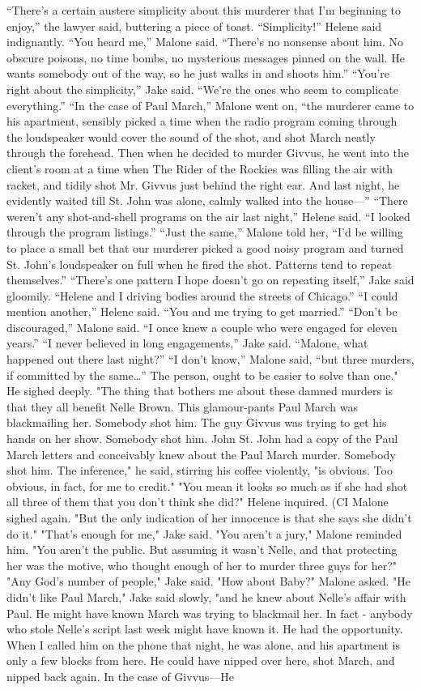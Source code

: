 \documentclass{novel}
\begin{document}
“There’s a certain austere simplicity about this murderer that I’m beginning to enjoy,” the lawyer said, buttering a piece of toast. “Simplicity!” Helene said indignantly. “You heard me,” Malone said. “There’s no nonsense about him. No obscure poisons, no time bombs, no mysterious messages pinned on the wall. He wants somebody out of the way, so he just walks in and shoots him.” “You’re right about the simplicity,” Jake said. “We’re the ones who seem to complicate everything.” “In the case of Paul March,” Malone went on, “the murderer came to his apartment, sensibly picked a time when the radio program coming through the loudspeaker would cover the sound of the shot, and shot March neatly through the forehead. Then when he decided to murder Givvus, he went into the client’s room at a time when The Rider of the Rockies was filling the air with racket, and tidily shot Mr. Givvus just behind the right ear. And last night, he evidently waited till St. John was alone, calmly walked into the house—” “There weren’t any shot-and-shell programs on the air last night,” Helene said. “I looked through the program listings.” “Just the same,” Malone told her, “I'd be willing to place a small bet that our murderer picked a good noisy program and turned St. John’s loudspeaker on full when he fired the shot. Patterns tend to repeat themselves.” “There’s one pattern I hope doesn’t go on repeating itself,” Jake said gloomily. “Helene and I driving bodies around the streets of Chicago.” “I could mention another,” Helene said. “You and me trying to get married.” “Don’t be discouraged,” Malone said. “I once knew a couple who were engaged for eleven years.” “I never believed in long engagements,” Jake said. “Malone, what happened out there last night?” “I don’t know,” Malone said, “but three murders, if committed by the same…” The person, ought to be easier to solve than one." He sighed deeply. "The thing that bothers me about these damned murders is that they all benefit Nelle Brown. This glamour-pants Paul March was blackmailing her. Somebody shot him. The guy Givvus was trying to get his hands on her show. Somebody shot him. John St. John had a copy of the Paul March letters and conceivably knew about the Paul March murder. Somebody shot him. The inference," he said, stirring his coffee violently, "is obvious. Too obvious, in fact, for me to credit." "You mean it looks so much as if she had shot all three of them that you don't think she did?" Helene inquired. (CI Malone sighed again. "But the only indication of her innocence is that she says she didn't do it." "That's enough for me," Jake said. "You aren't a jury," Malone reminded him. "You aren't the public. But assuming it wasn't Nelle, and that protecting her was the motive, who thought enough of her to murder three guys for her?" "Any God's number of people," Jake said. "How about Baby?" Malone asked. "He didn't like Paul March," Jake said slowly, "and he knew about Nelle's affair with Paul. He might have known March was trying to blackmail her. In fact - anybody who stole Nelle's script last week might have known it. He had the opportunity. When I called him on the phone that night, he was alone, and his apartment is only a few blocks from here. He could have nipped over here, shot March, and nipped back again. In the case of Givvus—He 
\end{document}
